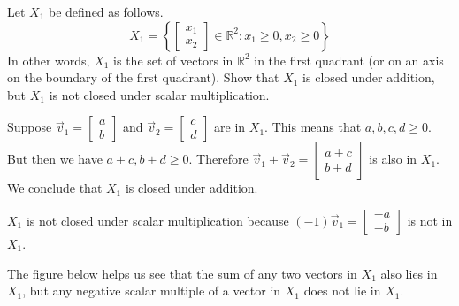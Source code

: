 \documentclass{ximera}
\begin{document}
\begin{example} \label{ex:Q1}
Let $X_1$ be defined as follows.
$$X_1=\left\{\begin{bmatrix} x_1\\x_2\end{bmatrix} \in \mathbb{R}^2 : x_1 \ge 0, x_2 \ge 0 \right\}$$
In other words, $X_1$ is the set of vectors in $\mathbb{R}^2$ in the first quadrant (or on an axis on the boundary of the first quadrant). Show that $X_1$ is closed under addition, but $X_1$ is not closed under scalar multiplication.
\begin{explanation} Suppose $\vec{v}_1=\begin{bmatrix}a\\b\end{bmatrix}$ and $\vec{v}_2=\begin{bmatrix}c\\d\end{bmatrix}$ are in $X_1$.  This means that $a, b, c, d\geq 0$.  But then we have $a+c, b+d\geq 0$.  Therefore $\vec{v}_1+\vec{v}_2=\begin{bmatrix}a+c\\b+d\end{bmatrix}$ is also in $X_1$. We conclude that $X_1$ is closed under addition.

$X_1$ is not closed under scalar multiplication because $(-1)\vec{v}_1=\begin{bmatrix}-a\\-b\end{bmatrix}$ is not in $X_1$.

The figure below helps us see that the sum of any two vectors in $X_1$ also lies in $X_1$, but any negative scalar multiple of a vector in $X_1$ does not lie in $X_1$.

\begin{center}
\quad
{}
\end{center}
\end{explanation}
\end{example}
\end{document}
